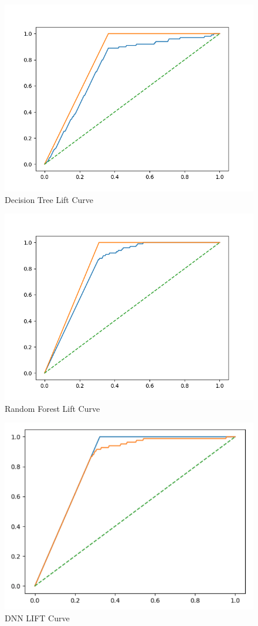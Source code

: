 \documentclass{../../Latex_Template/Homework/homework}
\begin{document}
  \begin{figure}[h]
    \centering
    \includegraphics[width=0.5\linewidth]{DST_LIFT.png}
    \caption{Decision Tree Lift Curve}
    \label{fig:DNN_PRC}
  \end{figure}
  
  \begin{figure}[h]
    \centering
    \includegraphics[width=0.5\linewidth]{RF_LIFT.png}
    \caption{Random Forest Lift Curve}
    \label{fig:RF_LIFT}
  \end{figure}
  
  \begin{figure}[h]
    \centering
    \includegraphics[width=0.5\linewidth]{DNN_LIFT.png}
    \caption{DNN LIFT Curve}
    \label{fig:DNN_LIFT}
  \end{figure}
\end{document}
